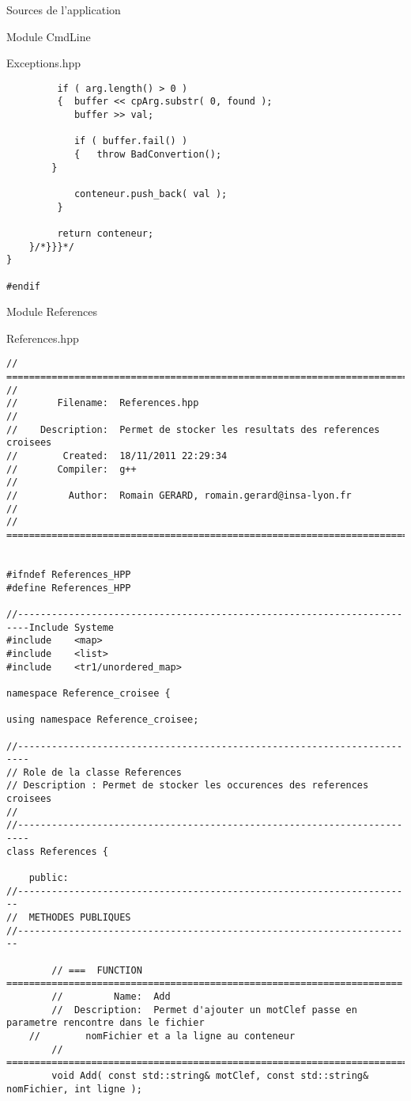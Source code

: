 \documentclass{article}
\begin{document}
\begin{section}{Sources de l'application}
\begin{subsection}{Module CmdLine}
\begin{paragraph}{Exceptions.hpp}
\begin{verbatim}
         if ( arg.length() > 0 )
         {	buffer << cpArg.substr( 0, found );
           	buffer >> val;

           	if ( buffer.fail() )
           	{	throw BadConvertion();
		}
           
           	conteneur.push_back( val );
         }

         return conteneur;
    }/*}}}*/
}

#endif
  \end{verbatim}
  \end{paragraph}

  \end{subsection}

  \newpage
  \begin{subsection}{Module References}
   
  \begin{paragraph}{References.hpp}
   \begin{verbatim}
// =====================================================================================
//
//       Filename:  References.hpp
//
//    Description:  Permet de stocker les resultats des references croisees
//        Created:  18/11/2011 22:29:34
//       Compiler:  g++
//
//         Author:  Romain GERARD, romain.gerard@insa-lyon.fr
//
// =====================================================================================


#ifndef References_HPP
#define References_HPP

//------------------------------------------------------------------------Include Systeme
#include    <map>
#include    <list>
#include    <tr1/unordered_map>

namespace Reference_croisee {

using namespace Reference_croisee;

//------------------------------------------------------------------------
// Role de la classe References
// Description : Permet de stocker les occurences des references croisees
//
//------------------------------------------------------------------------
class References {

    public:
//----------------------------------------------------------------------
//  METHODES PUBLIQUES
//----------------------------------------------------------------------

        // ===  FUNCTION  ======================================================================
        //         Name:  Add
        //  Description:  Permet d'ajouter un motClef passe en parametre rencontre dans le fichier
	//		  nomFichier et a la ligne au conteneur
        // =====================================================================================
        void Add( const std::string& motClef, const std::string& nomFichier, int ligne );


\end{verbatim}
\end{paragraph}
\end{subsection}
\end{section}
\end{document}
